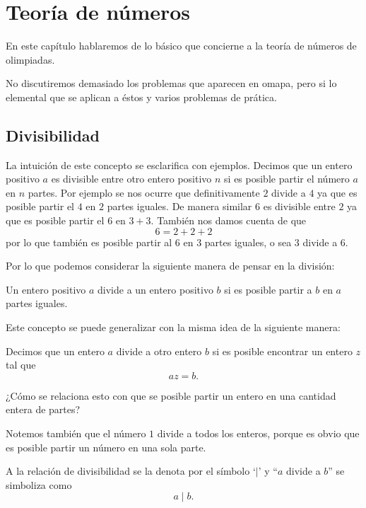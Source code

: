 \chapter{Teoría de números}
En este capítulo hablaremos de
lo básico que concierne a la
teoría de números de olimpiadas.

No discutiremos demasiado los
problemas que aparecen en omapa,
pero si lo elemental que se aplican
a éstos y varios problemas de prática.

\section{Divisibilidad}
La intuición de este concepto
se esclarifica con ejemplos.
Decimos que un entero positivo $a$
es divisible entre otro entero
positivo $n$ si es posible
partir el número $a$ en $n$ partes.
Por ejemplo se nos ocurre que definitivamente
$2$ divide a $4$ ya que es posible
partir el $4$ en $2$ partes iguales.
De manera similar $6$ es divisible
entre $2$ ya que es posible partir
el $6$ en $3 + 3$.
También nos damos cuenta de que
\[6 = 2 + 2 + 2\]
por lo que también es posible partir
al $6$ en $3$ partes iguales, o sea
$3$ divide a $6$.

Por lo que podemos considerar
la siguiente manera de pensar en la
división:

\begin{intuition*}
	Un entero positivo $a$ divide a
	un entero positivo $b$ si es posible
	partir a $b$ en $a$ partes iguales.
\end{intuition*}

Este concepto se puede generalizar
con la misma idea de la siguiente manera:

\begin{definition}
	\label{definition:div}
	Decimos que un entero $a$ divide
	a otro entero $b$ si es posible
	encontrar un entero $z$ tal que
	\[az = b.\]
\end{definition}

\begin{question*}
	¿Cómo se relaciona esto con que
	se posible partir un entero en
	una cantidad entera de partes?
\end{question*}

Notemos también que el número $1$
divide a todos los enteros, porque
es obvio que es posible partir un número
en una sola parte.

A la relación de divisibilidad
se la denota por el símbolo `$\mid$'
y ``$a$ divide a $b$'' se simboliza como
\[a \mid b.\]

